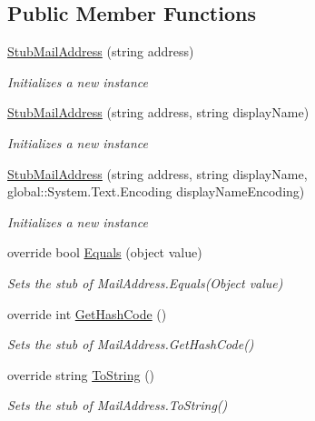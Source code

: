 \subsection*{Public Member Functions}
\begin{DoxyCompactItemize}
\item 
\hyperlink{class_system_1_1_net_1_1_mail_1_1_fakes_1_1_stub_mail_address_a203f923461c0e8cb55271662381b76ef}{Stub\-Mail\-Address} (string address)
\begin{DoxyCompactList}\small\item\em Initializes a new instance\end{DoxyCompactList}\item 
\hyperlink{class_system_1_1_net_1_1_mail_1_1_fakes_1_1_stub_mail_address_abdf6eaef8912f2f24514d83260b7cef9}{Stub\-Mail\-Address} (string address, string display\-Name)
\begin{DoxyCompactList}\small\item\em Initializes a new instance\end{DoxyCompactList}\item 
\hyperlink{class_system_1_1_net_1_1_mail_1_1_fakes_1_1_stub_mail_address_a4aa6e8a5d8a86d6b6d956f8eb843acaa}{Stub\-Mail\-Address} (string address, string display\-Name, global\-::\-System.\-Text.\-Encoding display\-Name\-Encoding)
\begin{DoxyCompactList}\small\item\em Initializes a new instance\end{DoxyCompactList}\item 
override bool \hyperlink{class_system_1_1_net_1_1_mail_1_1_fakes_1_1_stub_mail_address_ab6a3b629cc63e9eaa00e11a49e7dab46}{Equals} (object value)
\begin{DoxyCompactList}\small\item\em Sets the stub of Mail\-Address.\-Equals(\-Object value)\end{DoxyCompactList}\item 
override int \hyperlink{class_system_1_1_net_1_1_mail_1_1_fakes_1_1_stub_mail_address_a5c068f07705b78bd97fd94f3563247aa}{Get\-Hash\-Code} ()
\begin{DoxyCompactList}\small\item\em Sets the stub of Mail\-Address.\-Get\-Hash\-Code()\end{DoxyCompactList}\item 
override string \hyperlink{class_system_1_1_net_1_1_mail_1_1_fakes_1_1_stub_mail_address_ad5f12dc9c33ec7cde00461caccabfe7e}{To\-String} ()
\begin{DoxyCompactList}\small\item\em Sets the stub of Mail\-Address.\-To\-String()\end{DoxyCompactList}\end{DoxyCompactItemize}
